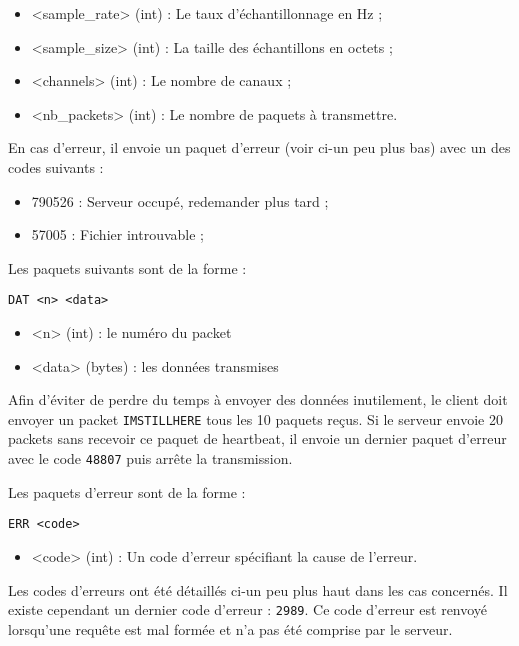 \documentclass[a4paper,10pt,openany,oneside]{report}
\begin{document}
\begin{itemize}
    \item <sample\_rate> (int) : Le taux d'échantillonnage en Hz ;
    \item <sample\_size> (int) : La taille des échantillons en octets ;
    \item <channels> (int) : Le nombre de canaux ;
    \item <nb\_packets> (int) : Le nombre de paquets à transmettre.
\end{itemize}

En cas d'erreur, il envoie un paquet d'erreur (voir ci-un peu plus bas) avec un
des codes suivants :

\begin{itemize}
    \item 790526 : Serveur occupé, redemander plus tard ;
    \item 57005 : Fichier introuvable ;
\end{itemize}

Les paquets suivants sont de la forme :

\begin{verbatim}
DAT <n> <data>
\end{verbatim}

\begin{itemize}
    \item <n> (int) : le numéro du packet
    \item <data> (bytes) : les données transmises
\end{itemize}

Afin d'éviter de perdre du temps à envoyer des données inutilement, le client
doit envoyer un packet \texttt{IMSTILLHERE} tous les 10 paquets reçus. Si le
serveur envoie 20 packets sans recevoir ce paquet de heartbeat, il envoie un
dernier paquet d'erreur avec le code \texttt{48807} puis arrête la
transmission.

Les paquets d'erreur sont de la forme :

\begin{verbatim}
ERR <code>
\end{verbatim}

\begin{itemize}
    \item <code> (int) : Un code d'erreur spécifiant la cause de l'erreur.
\end{itemize}

Les codes d'erreurs ont été détaillés ci-un peu plus haut dans les cas
concernés. Il existe cependant un dernier code d'erreur : \texttt{2989}. Ce
code d'erreur est renvoyé lorsqu'une requête est mal formée et n'a pas été
comprise par le serveur.
\end{document}

